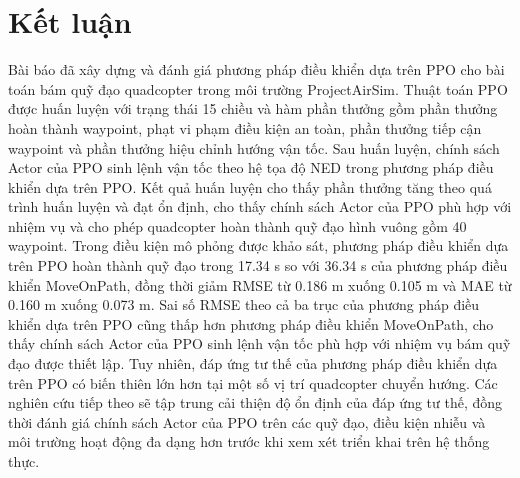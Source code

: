 \section{Kết luận}
\label{sec:conclusion}
Bài báo đã xây dựng và đánh giá phương pháp điều khiển dựa trên PPO cho bài toán bám quỹ đạo quadcopter trong môi trường ProjectAirSim. Thuật toán PPO được huấn luyện với trạng thái 15 chiều và hàm phần thưởng gồm phần thưởng hoàn thành waypoint, phạt vi phạm điều kiện an toàn, phần thưởng tiếp cận waypoint và phần thưởng hiệu chỉnh hướng vận tốc. Sau huấn luyện, chính sách Actor của PPO sinh lệnh vận tốc theo hệ tọa độ NED trong phương pháp điều khiển dựa trên PPO. Kết quả huấn luyện cho thấy phần thưởng tăng theo quá trình huấn luyện và đạt ổn định, cho thấy chính sách Actor của PPO phù hợp với nhiệm vụ và cho phép quadcopter hoàn thành quỹ đạo hình vuông gồm 40 waypoint. Trong điều kiện mô phỏng được khảo sát, phương pháp điều khiển dựa trên PPO hoàn thành quỹ đạo trong 17.34 s so với 36.34 s của phương pháp điều khiển MoveOnPath, đồng thời giảm RMSE từ 0.186 m xuống 0.105 m và MAE từ 0.160 m xuống 0.073 m. Sai số RMSE theo cả ba trục của phương pháp điều khiển dựa trên PPO cũng thấp hơn phương pháp điều khiển MoveOnPath, cho thấy chính sách Actor của PPO sinh lệnh vận tốc phù hợp với nhiệm vụ bám quỹ đạo được thiết lập. Tuy nhiên, đáp ứng tư thế của phương pháp điều khiển dựa trên PPO có biến thiên lớn hơn tại một số vị trí quadcopter chuyển hướng. Các nghiên cứu tiếp theo sẽ tập trung cải thiện độ ổn định của đáp ứng tư thế, đồng thời đánh giá chính sách Actor của PPO trên các quỹ đạo, điều kiện nhiễu và môi trường hoạt động đa dạng hơn trước khi xem xét triển khai trên hệ thống thực.
